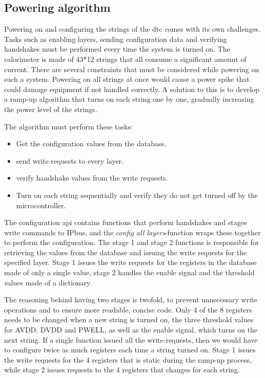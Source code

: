 \documentclass[main.tex]{subfiles}
\begin{document}
\subsection{Powering algorithm}
\label{ssec: power_algo}
Powering on and configuring the strings of the \gls{dtc} comes with its own challenges. Tasks such as enabling layers, sending configuration data and verifying handshakes must be performed every time the system is turned on. The calorimeter is made of 43*12 strings that all consume a significant amount of current. There are several constraints that must be considered while powering on such a system. Powering on all strings at once would cause a power spike that could damage equipment if not handled correctly. A solution to this is to develop a ramp-up algorithm that turns on each string one by one, gradually increasing the power level of the strings. 

The algorithm must perform these tasks:

\begin{itemize}
    \item Get the configuration values from the database.
    \item send write requests to every layer.
    \item verify handshake values from the write requests.
    \item Turn on each string sequentially and verify they do not get turned off by the microcontroller.
\end{itemize}

The configuration \gls{api} contains functions that perform handshakes and stages write commands to IPbus, and the \textit{config all layers}-function wraps these together to perform the configuration. The stage 1 and stage 2 functions is responsible for retrieving the values from the database and issuing the write requests for the specified layer. Stage 1 issues the write requests for the registers in the database made of only a single value, stage 2 handles the enable signal and the threshold values made of a dictionary.

The reasoning behind having two stages is twofold, to prevent unnecessary write operations and to ensure more readable, concise code. Only 4 of the 8 registers needs to be changed when a new string is turned on, the three threshold values for AVDD, DVDD and PWELL, as well as the enable signal, which turns on the next string. If a single function issued all the write-requests, then we would have to configure twice as much registers each time a string turned on. Stage 1 issues the write requests for the 4 registers that is static during the ramp-up process, while stage 2 issues requests to the 4 registers that changes for each string.
\end{document}
